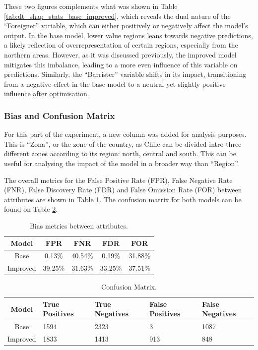 \documentclass[fleqn,10pt]{wlscirep}
\begin{document}
These two figures complements what was shown in Table \ref{tab:dt_shap_stats_base_improved}, which reveals the dual nature of the ``Foreigner'' variable, which can either positively or negatively affect the model’s output. In the base model, lower value regions leans towards negative predictions, a likely reflection of overrepresentation of certain regions, especially from the northern areas. However, as it was discussed previously, the improved model mitigates this imbalance, leading to a more even influence of this variable on predictions. Similarly, the “Barrister” variable shifts in its impact, transitioning from a negative effect in the base model to a neutral yet slightly positive influence after optimisation.

\subsubsection{Bias and Confusion Matrix}

For this part of the experiment, a new column was added for analysis purposes. This is ``Zona'', or the zone of the country, as Chile can be divided intro three different zones according to its region: north, central and south. This can be useful for analysing the impact of the model in a broader way than ``Region''. 

The overall metrics for the False Positive Rate (FPR), False Negative Rate (FNR), False Discovery Rate (FDR) and False Omission Rate (FOR) between attributes are shown in Table \ref{tab_bias_tdrogas:}. The confusion matrix for both models can be found on Table \ref{tab_cm_tdrogas:}.

\begin{table}[!htb]
\centering
\begin{tabular}{|c|c|c|c|c|}

        \hline
        \textbf{Model} & \textbf{FPR} & \textbf{FNR} & \textbf{FDR} & \textbf{FOR} \\ \hline
        Base & 0.13\% & 40.54\% & 0.19\% & 31.88\%  \\ 
        Improved & 39.25\% & 31.63\% & 33.25\% & 37.51\% \\ 
        
        \hline
    \end{tabular}
\caption{Bias metrics between attributes.}
\label{tab_bias_tdrogas:}
\end{table}

\begin{table}[!htb]
\centering
\begin{tabular}{|c|p{3cm}|p{3cm}|p{3cm}|p{3cm}|}
        \hline
        \textbf{Model} & \textbf{True Positives} & \textbf{True Negatives} & \textbf{False Positives} & \textbf{False Negatives}\\ \hline
        Base & 1594 & 2323 & 3 & 1087  \\ 
        Improved & 1833 & 1413 & 913 & 848  \\ 
        \hline
    \end{tabular}
\caption{Confusion Matrix.}
\label{tab_cm_tdrogas:}
\end{table}
\end{document}
